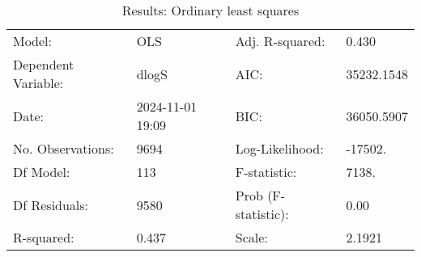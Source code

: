 \begin{table}
\caption{Results: Ordinary least squares}
\label{}
\begin{center}
\begin{tabular}{llll}
\hline
Model:              & OLS              & Adj. R-squared:     & 0.430       \\
Dependent Variable: & dlogS            & AIC:                & 35232.1548  \\
Date:               & 2024-11-01 19:09 & BIC:                & 36050.5907  \\
No. Observations:   & 9694             & Log-Likelihood:     & -17502.     \\
Df Model:           & 113              & F-statistic:        & 7138.       \\
Df Residuals:       & 9580             & Prob (F-statistic): & 0.00        \\
R-squared:          & 0.437            & Scale:              & 2.1921      \\
\hline
\end{tabular}
\end{center}


\end{table}
